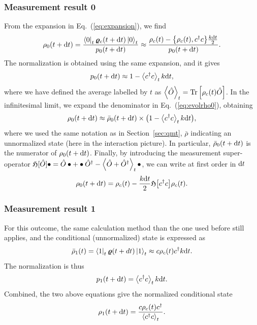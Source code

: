 \subsubsection{Measurement result 0}
From the expansion in Eq.~(\ref{eq:expansion}), we find
\begin{equation}
    \rho_0(t+\mathrm{d}t)=\frac{\bra{0}_t\bm{\varrho}_c(t+\mathrm{d}t)\ket{0}_t}{p_0(t+\mathrm{d}t)}\approx \frac{\rho_c(t)-\qty{\rho_c(t),c^\dagger c}\frac{k\mathrm{d}t}{2}}{p_0(t+\mathrm{d}t)}.
\end{equation}
The normalization is obtained using the same expansion, and it gives
\begin{equation}
    p_0(t+\mathrm{d}t)\approx1-\expval{c^\dagger c}_t k\mathrm{d}t,
\end{equation}
where we have defined the average labelled by $t$ as $\expval{\hat{O}}_t=\operatorname{Tr}\left[\rho_c(t)\hat{O}\right]$. In the infinitesimal limit, we expand the denominator in Eq.~(\ref{eq:evolrho0}), obtaining
\begin{equation}
    \rho_0(t+\mathrm{d}t)\approx\bar{\rho}_0(t+\mathrm{d}t)\times\qty(1-\expval{c^\dagger c}_t k\mathrm{d}t),
\end{equation}
where we used the same notation as in Section~\ref{sec:qmt}, $\bar{\rho}$ indicating an unnormalized state (here in the interaction picture). In particular, $\bar{\rho}_0(t+\mathrm{d}t)$ is the numerator of $\rho_0(t+\mathrm{d}t)$. Finally, by introducing the measurement super-operator $\mathfrak{H}[\hat{O}]\bullet=\hat{O}\bullet + \bullet \hat{O}^\dagger - \expval{\hat{O}+\hat{O}^\dagger}_t\bullet$, we can write at first order in $\mathrm{d}t$
\begin{equation}\label{eq:rho0}
    \rho_0(t+\mathrm{d}t) = \rho_c(t)-\frac{k\mathrm{d}t}{2}\mathfrak{H}\qty[c^\dagger c]\rho_c(t).
\end{equation}
\subsubsection{Measurement result 1}
For this outcome, the same calculation method than the one used before still applies, and the conditional (unnormalized) state is expressed as
\begin{equation}
    \bar{\rho}_1(t)=\bra{1}_t\bm{\varrho}(t+dt)\ket{1}_t\approx c\rho_c(t)c^\dagger k\mathrm{d}t.
\end{equation}
The normalization is thus
\begin{equation}
    p_1(t+\mathrm{d}t)=\expval{c^\dagger c}_t k\mathrm{d}t.
\end{equation}
Combined, the two above equations give the normalized conditional state
\begin{equation}\label{eq:rho1}
    \rho_1(t+\mathrm{d}t)=\frac{c\rho_c(t)c^\dagger}{\expval{c^\dagger c}_t}.
\end{equation} 
